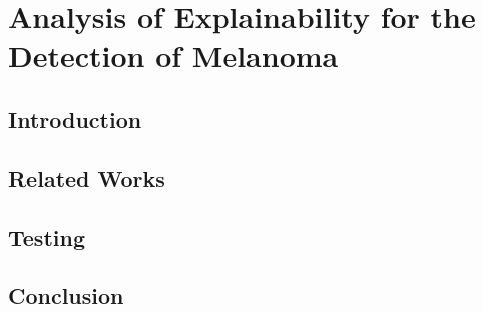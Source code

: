 \chapter{Analysis of Explainability for the Detection of Melanoma}

\section{Introduction}

\section{Related Works}

\section{Testing}

\section{Conclusion}